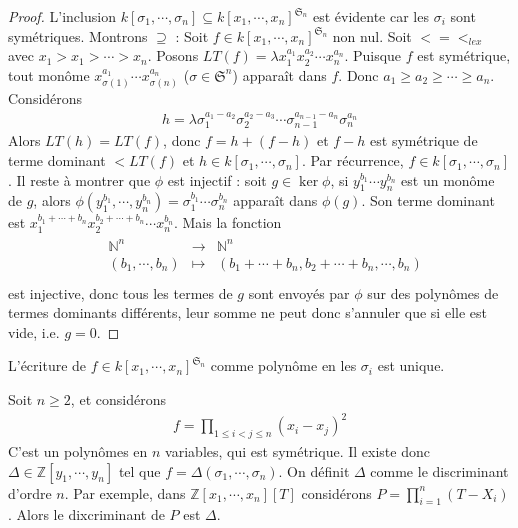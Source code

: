         \begin{proof}
            L'inclusion $k[\sigma_1, \cdots, \sigma_n] \subseteq k[x_1, \cdots, x_n]^{\mathfrak{S}_n}$ est évidente car les $\sigma_i$ sont symétriques. Montrons $\supseteq$ : Soit $f \in k[x_1, \cdots, x_n]^{\mathfrak{S}_n}$ non nul. Soit $< = <_{lex}$ avec $x_1 > x_1 > \cdots > x_n$. Posons $LT(f) = \lambda x_1^{a_1}x_2^{a_2} \cdots x_n^{a_n}$. Puisque $f$ est symétrique, tout monôme $x_{\sigma(1)}^{a_1} \cdots x_{\sigma(n)}^{a_n}$ ($\sigma \in \mathfrak{S}^n$) apparaît dans $f$. Donc $a_1 \geq a_2 \geq \cdots \geq a_n$. Considérons 
            \begin{align*}
                h = \lambda \sigma_1^{a_1 - a_2} \sigma_2^{a_2 - a_3} \cdots \sigma_{n - 1}^{a_{n - 1} - a_n} \sigma_n^{a_n}
            \end{align*}
            Alors $LT(h) = LT(f)$, donc $f = h + (f - h)$ et $f - h$ est symétrique de terme dominant $< LT(f)$ et $h \in k[\sigma_1, \cdots, \sigma_n]$. Par récurrence, $f \in k[\sigma_1, \cdots, \sigma_n]$. Il reste à montrer que $\phi$ est injectif : soit $g \in \ker \phi$, si $y_1^{b_1} \cdots y_n^{b_n}$ est un monôme de $g$, alors $\phi(y_1^{b_1}, \cdots, y_n^{b_n}) = \sigma_1^{b_1} \cdots \sigma_n^{b_n}$ apparaît dans $\phi(g)$. Son terme dominant est $x_1^{b_1 + \cdots + b_n}x_2^{b_2 + \cdots + b_n} \cdots x_n^{b_n}$. Mais la fonction
            \begin{align*}
                \begin{array}{cccc}
                    & \mathbb{N}^n & \to & \mathbb{N}^n \\
                    & (b_1, \cdots, b_n) & \mapsto & (b_1 + \cdots + b_n, b_2 + \cdots + b_n, \cdots, b_n) \\
                \end{array}
            \end{align*}
            est injective, donc tous les termes de $g$ sont envoyés par $\phi$ sur des polynômes de termes dominants différents, leur somme ne peut donc s'annuler que si elle est vide, i.e. $g = 0$.
        \end{proof}
        \begin{coro}
            L'écriture de $f \in k[x_1, \cdots, x_n]^{\mathfrak{S}_n}$ comme polynôme en les $\sigma_i$ est unique.
        \end{coro}
        \begin{expl}
            Soit $n \geq 2$, et considérons
            \begin{align*}
                f = \prod_{1 \leq i < j \leq n} (x_i - x_j)^2
            \end{align*}
            C'est un polynômes en $n$ variables, qui est symétrique. Il existe donc $\Delta \in \mathbb{Z}[y_1, \cdots, y_n]$ tel que $f = \Delta(\sigma_1, \cdots, \sigma_n)$. On définit $\Delta$ comme le discriminant d'ordre $n$. Par exemple, dans $\mathbb{Z}[x_1, \cdots, x_n][T]$ considérons $P = \prod_{i = 1}^n (T - X_i)$. Alors le dixcriminant de $P$ est $\Delta$.
        \end{expl}

